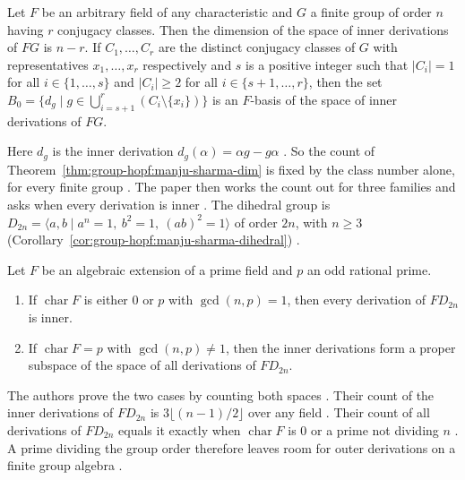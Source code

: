 \begin{theorem}\label{thm:group-hopf:manju-sharma-dim}
Let $F$ be an arbitrary field of any characteristic and $G$ a finite group of
order $n$ having $r$ conjugacy classes. Then the dimension of the space of inner
derivations of $FG$ is $n-r$. If $C_1,\dots,C_r$ are the distinct conjugacy
classes of $G$ with representatives $x_1,\dots,x_r$ respectively and $s$ is a
positive integer such that $|C_i|=1$ for all $i\in\{1,\dots,s\}$ and $|C_i|\ge2$
for all $i\in\{s+1,\dots,r\}$, then the set
$B_0=\{d_g\mid g\in\bigcup_{i=s+1}^{r}(C_i\setminus\{x_i\})\}$ is an $F$-basis of
the space of inner derivations of $FG$.
\end{theorem}

Here $d_g$ is the inner derivation $d_g(\alpha)=\alpha g-g\alpha$
\cite[Definition~2.2, p.~3]{ManjuSharma2026}. So the count of
Theorem~\ref{thm:group-hopf:manju-sharma-dim} is fixed by the class number
alone, for every finite group \cite[p.~5]{ManjuSharma2026}. The paper then works
the count out
for three families and asks when every derivation is inner
\cite[Corollary~3.6, p.~10]{ManjuSharma2026}. The dihedral group is
$D_{2n}=\langle a,b\mid a^n=1,\ b^2=1,\ (ab)^2=1\rangle$ of order $2n$, with
$n\ge3$ (Corollary~\ref{cor:group-hopf:manju-sharma-dihedral}) \cite[p.~6]{ManjuSharma2026}.

\begin{corollary}\label{cor:group-hopf:manju-sharma-dihedral}
Let $F$ be an algebraic extension of a prime field and $p$ an odd rational
prime.
\begin{enumerate}
\item If $\operatorname{char}F$ is either $0$ or $p$ with $\gcd(n,p)=1$, then
every derivation of $FD_{2n}$ is inner.
\item If $\operatorname{char}F=p$ with $\gcd(n,p)\neq1$, then the inner
derivations form a proper subspace of the space of all derivations of $FD_{2n}$.
\end{enumerate}
\end{corollary}

The authors prove the two cases by counting both spaces
\cite[Theorem~3.5, p.~10]{ManjuSharma2026}. Their count of the inner derivations
of $FD_{2n}$ is $3\lfloor (n-1)/2\rfloor$ over any field
\cite[Theorem~3.5, p.~10]{ManjuSharma2026}. Their count of all derivations of
$FD_{2n}$ equals it exactly when $\operatorname{char}F$ is $0$ or a prime not
dividing $n$ \cite[Theorem~3.3, p.~7]{ManjuSharma2026}. A prime dividing the
group order therefore leaves room for outer derivations on a finite group
algebra \cite[Corollary~3.6, p.~10]{ManjuSharma2026}.

